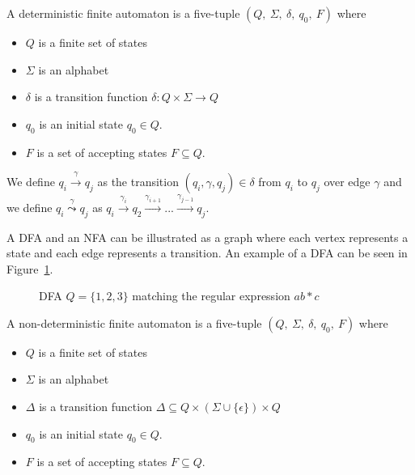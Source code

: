\documentclass[12pt]{article}
\theoremstyle{definition}
\begin{document}
\begin{definition} A deterministic finite automaton is a five-tuple $(Q,\ \Sigma,\ \delta,\ q_0,\ F)$ where
\label{dfa definition}

\begin{itemize}
	\item $Q$ is a finite set of states
	\item $\Sigma$ is an alphabet
	\item $\delta$ is a transition function $\delta: Q \times \Sigma \rightarrow Q$
	\item $q_0$ is an initial state $q_0 \in Q$.
	\item $F$ is a set of accepting states $F \subseteq Q$.
\end{itemize}
\end{definition}

We define $q_i \xrightarrow{\gamma} q_j$ as the transition $(q_i, \gamma, q_j) \in \delta$ from $q_i$ to $q_j$ over edge $\gamma$ and we define $q_i \overset{\gamma}{\leadsto} q_j$ as $q_i \xrightarrow{\gamma_i} q_2 \xrightarrow{\gamma_{i+1}} ... \xrightarrow{\gamma_{j-1}} q_{j}$.
 
A DFA and an NFA can be illustrated as a graph where each vertex represents a state and each edge represents a transition. An example of a DFA can be seen in Figure~\ref{dfa_simple}. \\

\begin{figure}[H]
  \begin{center}

	
	\caption{DFA $Q = \{1, 2, 3\}$ matching the regular expression \underline{$ab*c$}}
	\label{dfa_simple}
  \end{center}
\end{figure}


\begin{definition} A non-deterministic finite automaton is a five-tuple $(Q,\ \Sigma,\ \delta,\ q_0,\ F)$ where

\begin{itemize}
	\item $Q$ is a finite set of states
	\item $\Sigma$ is an alphabet
	\item $\Delta$ is a transition function $\Delta \subseteq Q \times (\Sigma \cup \{\epsilon\}) \times Q$
	\item $q_0$ is an initial state $q_0 \in Q$.
	\item $F$ is a set of accepting states $F \subseteq Q$.
\end{itemize}

\label{nfa definition}
\end{definition}
\end{document}
